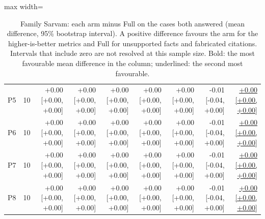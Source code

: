 \begin{table}[t]
\begin{adjustbox}{max width=\textwidth}
\begin{tabular}{@{}lrrrrrrrr@{}}
P5 & 10 & +0.00 [+0.00, +0.00] & +0.00 [+0.00, +0.00] & +0.00 [+0.00, +0.00] & +0.00 [+0.00, +0.00] & +0.00 [+0.00, +0.00] & -0.01 [-0.04, +0.00] & \underline{+0.00 [+0.00, +0.00]} \\
P6 & 10 & +0.00 [+0.00, +0.00] & +0.00 [+0.00, +0.00] & +0.00 [+0.00, +0.00] & +0.00 [+0.00, +0.00] & +0.00 [+0.00, +0.00] & -0.01 [-0.04, +0.00] & \underline{+0.00 [+0.00, +0.00]} \\
P7 & 10 & +0.00 [+0.00, +0.00] & +0.00 [+0.00, +0.00] & +0.00 [+0.00, +0.00] & +0.00 [+0.00, +0.00] & +0.00 [+0.00, +0.00] & -0.01 [-0.04, +0.00] & \underline{+0.00 [+0.00, +0.00]} \\
P8 & 10 & +0.00 [+0.00, +0.00] & +0.00 [+0.00, +0.00] & +0.00 [+0.00, +0.00] & +0.00 [+0.00, +0.00] & +0.00 [+0.00, +0.00] & -0.01 [-0.04, +0.00] & \underline{+0.00 [+0.00, +0.00]} \\
\bottomrule
\end{tabular}
\end{adjustbox}
\caption{Family Sarvam: each arm minus Full on the cases both answered (mean difference, 95\% bootstrap interval). A positive difference favours the arm for the higher-is-better metrics and Full for unsupported facts and fabricated citations. Intervals that include zero are not resolved at this sample size. Bold: the most favourable mean difference in the column; underlined: the second most favourable.}
\label{tab:ablate_sarvam}
\end{table}